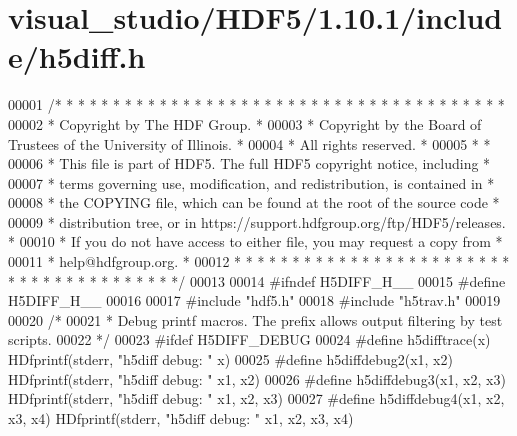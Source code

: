 \hypertarget{visual__studio_2_h_d_f5_21_810_81_2include_2h5diff_8h_source}{}\section{visual\+\_\+studio/\+H\+D\+F5/1.10.1/include/h5diff.h}
\label{visual__studio_2_h_d_f5_21_810_81_2include_2h5diff_8h_source}

\begin{DoxyCode}
00001 \textcolor{comment}{/* * * * * * * * * * * * * * * * * * * * * * * * * * * * * * * * * * * * * * *}
00002 \textcolor{comment}{ * Copyright by The HDF Group.                                               *}
00003 \textcolor{comment}{ * Copyright by the Board of Trustees of the University of Illinois.         *}
00004 \textcolor{comment}{ * All rights reserved.                                                      *}
00005 \textcolor{comment}{ *                                                                           *}
00006 \textcolor{comment}{ * This file is part of HDF5.  The full HDF5 copyright notice, including     *}
00007 \textcolor{comment}{ * terms governing use, modification, and redistribution, is contained in    *}
00008 \textcolor{comment}{ * the COPYING file, which can be found at the root of the source code       *}
00009 \textcolor{comment}{ * distribution tree, or in https://support.hdfgroup.org/ftp/HDF5/releases.  *}
00010 \textcolor{comment}{ * If you do not have access to either file, you may request a copy from     *}
00011 \textcolor{comment}{ * help@hdfgroup.org.                                                        *}
00012 \textcolor{comment}{ * * * * * * * * * * * * * * * * * * * * * * * * * * * * * * * * * * * * * * */}
00013 
00014 \textcolor{preprocessor}{#ifndef H5DIFF\_H\_\_}
00015 \textcolor{preprocessor}{#define H5DIFF\_H\_\_}
00016 
00017 \textcolor{preprocessor}{#include "hdf5.h"}
00018 \textcolor{preprocessor}{#include "h5trav.h"}
00019 
00020 \textcolor{comment}{/*}
00021 \textcolor{comment}{ * Debug printf macros. The prefix allows output filtering by test scripts.}
00022 \textcolor{comment}{ */}
00023 \textcolor{preprocessor}{#ifdef H5DIFF\_DEBUG}
00024 \textcolor{preprocessor}{#define h5difftrace(x) HDfprintf(stderr, "h5diff debug: " x)}
00025 \textcolor{preprocessor}{#define h5diffdebug2(x1, x2) HDfprintf(stderr, "h5diff debug: " x1, x2)}
00026 \textcolor{preprocessor}{#define h5diffdebug3(x1, x2, x3) HDfprintf(stderr, "h5diff debug: " x1, x2, x3)}
00027 \textcolor{preprocessor}{#define h5diffdebug4(x1, x2, x3, x4) HDfprintf(stderr, "h5diff debug: " x1, x2, x3, x4)}

\end{DoxyCode}
